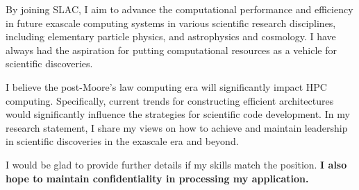 \documentclass[11pt, letterpaper]{awesome-cv}
\begin{document}
\begin{cvletter}


By joining SLAC, I aim  to advance the computational performance and efficiency in future
exascale computing systems in various scientific research disciplines, 
including elementary particle physics, and astrophysics and cosmology. I have always had  the aspiration for
putting computational resources as a vehicle for scientific discoveries.

I believe the post-Moore's law computing era will significantly impact HPC
computing. Specifically, current  trends for constructing efficient
architectures would significantly influence the strategies for scientific code development. 
In my research statement, I share my views on how to achieve
and maintain leadership in scientific discoveries in the exascale era and beyond. 

I would be glad to provide further details if my skills match the position. 
{\bf I also hope  to maintain confidentiality in processing my
application.} 


\end{cvletter}


\makeletterclosing
\end{document}
